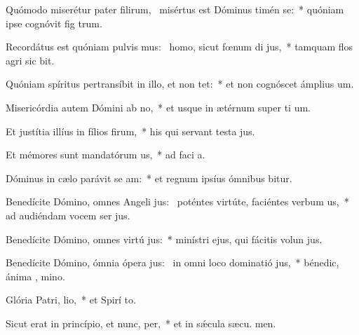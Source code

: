 \item Quómodo miserétur pater filirum,~\pscross{} misértus est Dóminus timén se:~* quóniam ipse cognóvit fig trum.
\item Recordátus est quóniam pulvis mus:~\pscross{} homo, sicut fœnum di jus,~* tamquam flos agri sic bit.
\item Quóniam spíritus pertransíbit in illo, et non tet:~* et non cognóscet ámplius  um.
\item Misericórdia autem Dómini ab no,~* et usque in ætérnum super ti um.
\item Et justítia illíus in fílios firum,~* his qui servant testa jus.
\item Et mémores sunt mandatórum us,~* ad faci a.
\item Dóminus in cælo parávit se am:~* et regnum ipsíus ómnibus bitur.
\item Benedícite Dómino, omnes Angeli jus:~\pscross{} poténtes virtúte, faciéntes verbum us,~* ad audiéndam vocem ser jus.
\item Benedícite Dómino, omnes virtú jus:~* minístri ejus, qui fácitis volun jus.
\item Benedícite Dómino, ómnia ópera jus:~\pscross{} in omni loco dominatió jus,~* bénedic, ánima , mino.
\item Glória Patri,  lio,~* et Spirí to.
\item Sicut erat in princípio, et nunc,  per,~* et in sǽcula sæcu. men.
